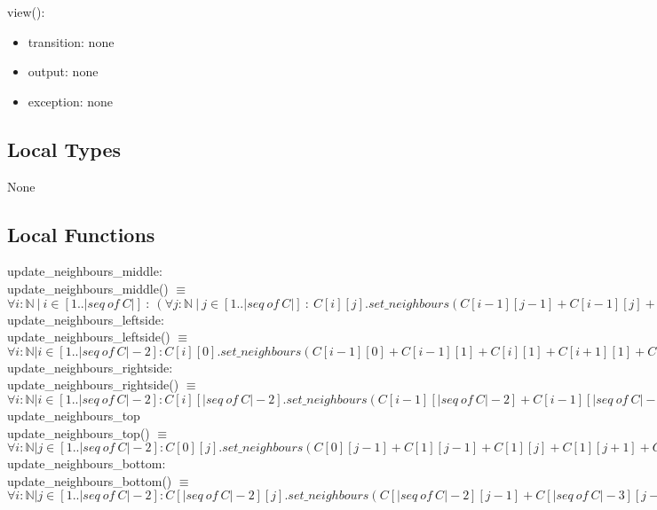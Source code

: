 \documentclass[12pt]{article}
\begin{document}
\noindent
view():
\begin{itemize}
    \item transition: none
    \item output: none
    \item exception: none
\end{itemize}

\subsection*{Local Types}

None

\subsection*{Local Functions}

\noindent
update\_neighbours\_middle: \\
update\_neighbours\_middle() $\equiv$ $\forall i : \mathbb{N} \ | \ i \in [1..|seq \ of \ C|] \ : \ (\forall j : \mathbb{N} \ | \ j \in [1..|seq \ of \ C|] \ : \ C[i][j].set\_neighbours(C[i-1][j-1] + C[i-1][j] + C[i-1][j+1] + C[i][j-1] + C[i][j+1] + C[i+1][j-1] + C[i+1][j] + C[i+1][j+1]))$ \\

\noindent
update\_neighbours\_leftside: \\
update\_neighbours\_leftside() $\equiv$ $\forall i : \mathbb{N} | i \in [1..|seq \ of \ C|-2] : C[i][0].set\_neighbours(C[i-1][0] + C[i-1][1] + C[i][1] + C[i+1][1] + C[i+1][0])$ \\

\noindent
update\_neighbours\_rightside: \\
update\_neighbours\_rightside() $\equiv$ $\forall i : \mathbb{N} | i \in [1..|seq \ of \ C|-2] : C[i][|seq \ of \ C|-2].set\_neighbours(C[i-1][|seq \ of \ C|-2] + C[i-1][|seq \ of \ C|-3] + C[i][|seq \ of \ C|-3] + C[i+1][|seq \ of \ C|-3] + C[i+1][|seq \ of \ C|-2])$ \\

\noindent
update\_neighbours\_top\\
update\_neighbours\_top() $\equiv$ $\forall i : \mathbb{N} | j \in [1..|seq \ of \ C|-2] : C[0][j].set\_neighbours(C[0][j-1] + C[1][j-1] + C[1][j] + C[1][j+1] + C[0][j+1|])$ \\

\noindent
update\_neighbours\_bottom: \\
update\_neighbours\_bottom() $\equiv$ $\forall i : \mathbb{N} | j \in [1..|seq \ of \ C|-2] : C[|seq \ of \ C|-2][j].set\_neighbours(C[|seq \ of \ C|-2][j-1] + C[|seq \ of \ C|-3][j-1] + C[|seq \ of \ C|-3][j] + C[|seq \ of \ C|-3][j+1] + C[|seq \ of \ C|-2][j+1|])$ \\
\end{document}
